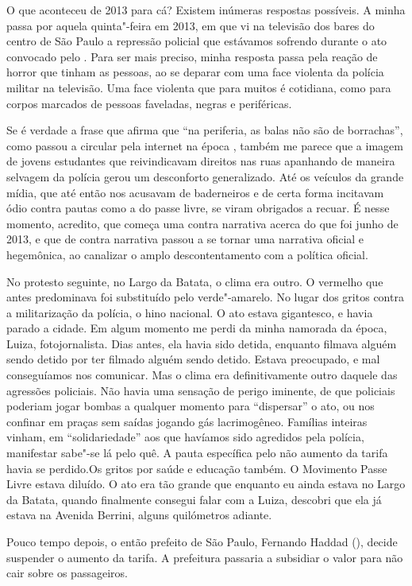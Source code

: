 O que aconteceu de 2013 para cá? Existem inúmeras respostas possíveis. A
minha passa por aquela quinta"-feira em 2013, em que vi na televisão dos
bares do centro de São Paulo a repressão policial que estávamos sofrendo
durante o ato convocado pelo . Para ser mais preciso, minha resposta
passa pela reação de horror que tinham as pessoas, ao se deparar com uma
face violenta da polícia militar na televisão. Uma face violenta que
para muitos é cotidiana, como para corpos marcados de pessoas faveladas,
negras e periféricas.

Se é verdade a frase que afirma que ``na periferia, as balas não são de
borrachas'', como passou a circular pela internet na época , também me
parece que a imagem de jovens estudantes que reivindicavam direitos nas
ruas apanhando de maneira selvagem da polícia gerou um desconforto
generalizado. Até os veículos da grande mídia, que até então nos
acusavam de baderneiros e de certa forma incitavam ódio contra pautas
como a do passe livre, se viram obrigados a recuar. É nesse momento,
acredito, que começa uma contra narrativa acerca do que foi junho de
2013, e que de contra narrativa passou a se tornar uma narrativa oficial
e hegemônica, ao canalizar o amplo descontentamento com a política
oficial.

No protesto seguinte, no Largo da Batata, o clima era outro. O vermelho
que antes predominava foi substituído pelo verde"-amarelo. No lugar dos
gritos contra a militarização da polícia, o hino nacional. O ato estava
gigantesco, e havia parado a cidade. Em algum momento me perdi da minha
namorada da época, Luiza, fotojornalista. Dias antes, ela havia sido
detida, enquanto filmava alguém sendo detido por ter filmado alguém
sendo detido. Estava preocupado, e mal conseguíamos nos comunicar. Mas o
clima era definitivamente outro daquele das agressões policiais. Não
havia uma sensação de perigo iminente, de que policiais poderiam jogar
bombas a qualquer momento para ``dispersar'' o ato, ou nos confinar em
praças sem saídas jogando gás lacrimogêneo. Famílias inteiras vinham, em
``solidariedade'' aos que havíamos sido agredidos pela polícia,
manifestar sabe"-se lá pelo quê. A pauta específica pelo não aumento da
tarifa havia se perdido.Os gritos por saúde e educação também. O
Movimento Passe Livre estava diluído. O ato era tão grande que enquanto
eu ainda estava no Largo da Batata, quando finalmente consegui falar com
a Luiza, descobri que ela já estava na Avenida Berrini, alguns
quilómetros adiante.

Pouco tempo depois, o então prefeito de São Paulo, Fernando Haddad (),
decide suspender o aumento da tarifa. A prefeitura passaria a subsidiar
o valor para não cair sobre os passageiros.

